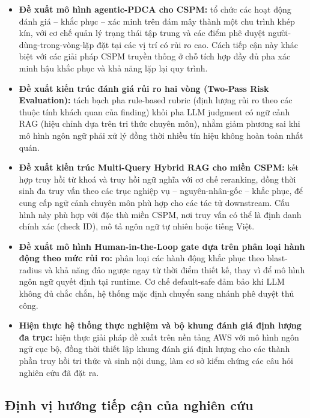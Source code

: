 \begin{itemize}
    \item \textbf{Đề xuất mô hình agentic-PDCA cho CSPM:} tổ chức các hoạt động đánh giá – khắc phục – xác minh trên đám mây thành một chu trình khép kín, với cơ chế quản lý trạng thái tập trung và các điểm phê duyệt người-dùng-trong-vòng-lặp đặt tại các vị trí có rủi ro cao. Cách tiếp cận này khác biệt với các giải pháp CSPM truyền thống ở chỗ tích hợp đầy đủ pha xác minh hậu khắc phục và khả năng lặp lại quy trình.

    \item \textbf{Đề xuất kiến trúc đánh giá rủi ro hai vòng (Two-Pass Risk Evaluation):} tách bạch pha rule-based rubric (định lượng rủi ro theo các thuộc tính khách quan của finding) khỏi pha LLM judgment có ngữ cảnh RAG (hiệu chỉnh dựa trên tri thức chuyên môn), nhằm giảm phương sai khi mô hình ngôn ngữ phải xử lý đồng thời nhiều tín hiệu không hoàn toàn nhất quán.

    \item \textbf{Đề xuất kiến trúc Multi-Query Hybrid RAG cho miền CSPM:} kết hợp truy hồi từ khoá và truy hồi ngữ nghĩa với cơ chế reranking, đồng thời sinh đa truy vấn theo các trục nghiệp vụ – nguyên-nhân-gốc – khắc phục, để cung cấp ngữ cảnh chuyên môn phù hợp cho các tác tử downstream. Cấu hình này phù hợp với đặc thù miền CSPM, nơi truy vấn có thể là định danh chính xác (check ID), mô tả ngôn ngữ tự nhiên hoặc tiếng Việt.

    \item \textbf{Đề xuất mô hình Human-in-the-Loop gate dựa trên phân loại hành động theo mức rủi ro:} phân loại các hành động khắc phục theo blast-radius và khả năng đảo ngược ngay từ thời điểm thiết kế, thay vì để mô hình ngôn ngữ quyết định tại runtime. Cơ chế default-safe đảm bảo khi LLM không đủ chắc chắn, hệ thống mặc định chuyển sang nhánh phê duyệt thủ công.

    \item \textbf{Hiện thực hệ thống thực nghiệm và bộ khung đánh giá định lượng đa trục:} hiện thực giải pháp đề xuất trên nền tảng AWS với mô hình ngôn ngữ cục bộ, đồng thời thiết lập khung đánh giá định lượng cho các thành phần truy hồi tri thức và sinh nội dung, làm cơ sở kiểm chứng các câu hỏi nghiên cứu đã đặt ra.
\end{itemize}

\subsection*{Định vị hướng tiếp cận của nghiên cứu}
\label{subsec:positioning}

